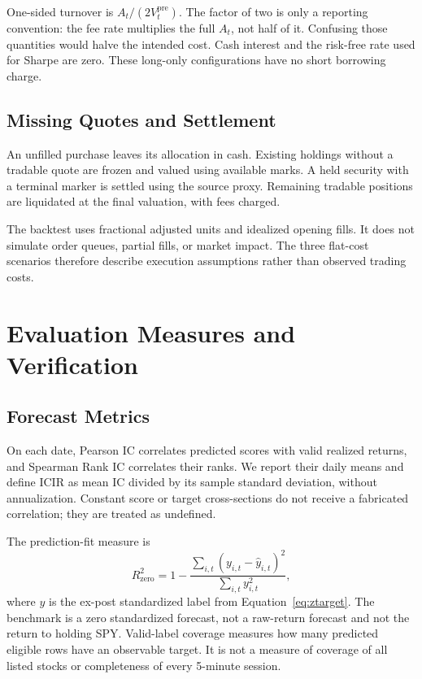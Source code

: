 \documentclass[11pt,a4paper]{article}
\begin{document}
One-sided turnover is $A_t/(2V_t^{\mathrm{pre}})$. The factor of two is only a
reporting convention: the fee rate multiplies the full $A_t$, not half of it.
Confusing those quantities would halve the intended cost. Cash interest and
the risk-free rate used for Sharpe are zero. These long-only configurations have
no short borrowing charge.

\subsection{Missing Quotes and Settlement}
An unfilled purchase leaves its allocation in cash. Existing holdings without
a tradable quote are frozen and valued using available marks. A held security
with a terminal marker is settled using the source proxy. Remaining tradable
positions are liquidated at the final valuation, with fees charged.

The backtest uses fractional adjusted units and idealized opening fills.
It does not simulate order queues, partial fills, or market impact. The three
flat-cost scenarios therefore describe execution assumptions rather than
observed trading costs.

\section{Evaluation Measures and Verification}
\label{sec:metrics}
\subsection{Forecast Metrics}
On each date, Pearson IC correlates predicted scores with valid realized
returns, and Spearman Rank IC correlates their ranks. We report their daily
means and define ICIR as mean IC divided by its sample standard deviation,
without annualization. Constant score or target cross-sections do not receive
a fabricated correlation; they are treated as undefined.

The prediction-fit measure is
\begin{equation}
R^2_{\mathrm{zero}}=
1-\frac{\sum_{i,t}(y_{i,t}-\hat y_{i,t})^2}
{\sum_{i,t}y_{i,t}^2},
\label{eq:r2}
\end{equation}
where $y$ is the ex-post standardized label from Equation~\eqref{eq:ztarget}.
The benchmark is a zero standardized forecast, not a raw-return forecast
and not the return to holding SPY. Valid-label coverage measures how many
predicted eligible rows have an observable target. It is not a measure of
coverage of all listed stocks or completeness of every 5-minute session.
\end{document}
